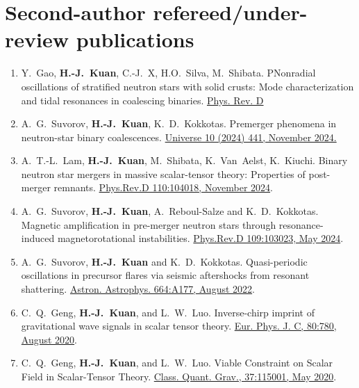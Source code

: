 \documentclass[10pt,floatfix,a4paper]{article}
\begin{document}
\section*{Second-author refereed/under-review publications}
\begin{enumerate}
	\item Y.~Gao, \textbf{H.-J.~Kuan}, C.-J.~X, H.O.~Silva, M.~Shibata. PNonradial oscillations of stratified neutron stars with solid crusts: Mode characterization and tidal resonances in coalescing binaries. \href{https://arxiv.org/abs/2509.00257}{Phys. Rev. D}
	\item A.~G.~Suvorov, \textbf{H.-J.~Kuan}, K.~D.~Kokkotas. Premerger phenomena in neutron-star binary coalescences. \href{https://www.mdpi.com/2218-1997/10/12/441}{Universe 10 (2024) 441, November 2024.}
	\item A.~T.-L.~Lam, \textbf{H.-J.~Kuan}, M.~Shibata, K.~Van~Aelst, K.~Kiuchi. Binary neutron star mergers in massive scalar-tensor theory: Properties of post-merger remnants. \href{https://journals.aps.org/prd/abstract/10.1103/PhysRevD.110.104018}{Phys.Rev.D 110:104018, November 2024}.
	\item A.~G.~Suvorov, \textbf{H.-J.~Kuan}, A.~Reboul-Salze and K.~D.~Kokkotas. Magnetic amplification in pre-merger neutron stars through resonance-induced magnetorotational instabilities.  \href{https://journals.aps.org/prd/abstract/10.1103/PhysRevD.109.103023}{Phys.Rev.D 109:103023, May 2024}.
	\item A.~G.~Suvorov, \textbf{H.-J.~Kuan} and K.~D.~Kokkotas. Quasi-periodic oscillations in precursor flares via seismic aftershocks from resonant shattering. \href{https://www.aanda.org/articles/aa/full_html/2022/08/aa44082-22/aa44082-22.html}{Astron. Astrophys. 664:A177, August 2022}.
	\item C.~Q.~Geng, \textbf{H.-J.~Kuan}, and L.~W.~Luo. Inverse-chirp imprint of gravitational wave signals in scalar tensor theory. \href{https://doi.org/10.1140/epjc/s10052-020-8359-y}{Eur. Phys. J. C, 80:780, August 2020}.
	\item C.~Q.~Geng, \textbf{H.-J.~Kuan}, and L.~W.~Luo. Viable Constraint on Scalar Field in Scalar-Tensor Theory.	\href{https://doi.org/10.1088/1361-6382/ab86fb}{Class. Quant. Grav., 37:115001, May 2020}.
\end{enumerate}
\end{document}
